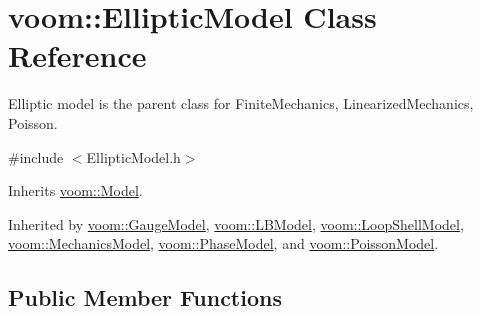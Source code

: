 \hypertarget{classvoom_1_1_elliptic_model}{
\section{voom::EllipticModel Class Reference}
\label{classvoom_1_1_elliptic_model}
}


Elliptic model is the parent class for FiniteMechanics, LinearizedMechanics, Poisson.  


{\ttfamily \#include $<$EllipticModel.h$>$}

Inherits \hyperlink{classvoom_1_1_model}{voom::Model}.

Inherited by \hyperlink{classvoom_1_1_gauge_model}{voom::GaugeModel}, \hyperlink{classvoom_1_1_l_b_model}{voom::LBModel}, \hyperlink{classvoom_1_1_loop_shell_model}{voom::LoopShellModel}, \hyperlink{classvoom_1_1_mechanics_model}{voom::MechanicsModel}, \hyperlink{classvoom_1_1_phase_model}{voom::PhaseModel}, and \hyperlink{classvoom_1_1_poisson_model}{voom::PoissonModel}.\subsection*{Public Member Functions}
